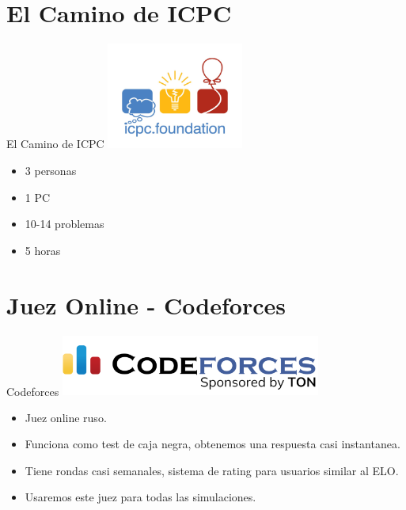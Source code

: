 \documentclass{beamer}
\begin{document}
\section{El Camino de ICPC}
\begin{frame}{El Camino de ICPC}
    \centering
    \includegraphics[clip,height=3.5cm,keepaspectratio]{logos/icpc.jpeg}

    \centering
    \begin{itemize}
        \item 3 personas
        \item 1 PC
        \item 10-14 problemas
        \item 5 horas
    \end{itemize}
\end{frame}

\section{Juez Online - Codeforces}
\begin{frame}{Codeforces}
    \centering
    \includegraphics[height=2cm,keepaspectratio]{logos/codeforces-sponsored-by-ton.png}
    \begin{itemize}
        \item Juez online ruso.
        \item Funciona como test de caja negra, obtenemos una respuesta casi instantanea.
        \item Tiene rondas casi semanales, sistema de rating para usuarios similar al ELO.
        \item Usaremos este juez para todas las simulaciones.
    \end{itemize}
\end{frame}
\end{document}
